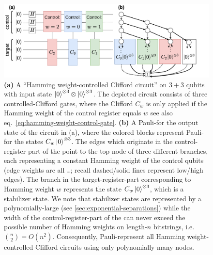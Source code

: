 
\begin{figure}[b!th]
	\centering
	\includegraphics[width=\textwidth]{pics/weight-controlled-stabilizer-state-2.pdf}
	\caption{
        \textbf{(a)} A ``Hamming weight-controlled Clifford circuit'' on $3+3$ qubits with input state $\ket{0}^{\otimes 3} \otimes \ket{0}^{\otimes 3}$. 
        The depicted circuit consists of three controlled-Clifford gates, where the Clifford $C_w$ is only applied if the Hamming weight of the control register equals $w$ see also eq.~\eqref{eq:hamming-weight-control-gate}.
        \textbf{(b)} A Pauli-\limdd for the output state of the circuit in (a), where the colored blocks represent Pauli-\limdds for the states $C_w \ket{0}^{\otimes 3}$.
        The edges which originate in the control-register-part of the \limdd point to the top node of three different branches, each representing a constant Hamming weight of the control qubits (edge weights are all $\mathbb{I}_{}$; recall dashed/solid lines represent low/high edges).
        The branch in the target-register-part corresponding to Hamming weight $w$ represents the state $C_w \ket{0}^{\otimes 3}$, which is a stabilizer state.
        We note that stabilizer states are represented by a polynomially-large \limdd (see \autoref{sec:exponential-separations}) while the width of the control-register-part of the \limdd can never exceed the possible number of Hamming weights on length-$n$ bitstrings, i.e. ${n \choose 2} = O(n^2)$.
        Consequently, Pauli-\limdds represent all Hamming weight-controlled Clifford circuits using only polynomially-many nodes.
    }
	\label{fig:weight-controlled-stabilizer-state}
\end{figure}

